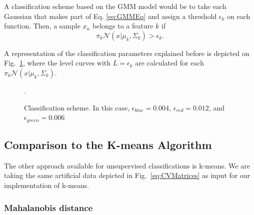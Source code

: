 \documentclass[letterpaper, 10 pt, conference]{ieeeconf}  %
\begin{document}
A classification scheme based on the GMM model would be to take each Gaussian that makes part of Eq. \ref{eq:GMMEq} and assign a threshold $\epsilon_{k}$ on each function.  Then, a sample $x_{n}$ belongs to a feature $k$ if  
\begin{equation*}
    \pi_{k} \mathcal{N}(x | \mu_{k},\Sigma_{k}) > \epsilon_{k}.
\end{equation*}

A representation of the classification parameters explained before is depicted on Fig.~\ref{fig:LevelsClassificationInsight}, where the level curves with $L = \epsilon_{k}$ are calculated for each $\pi_{k} \mathcal{N}(x | \mu_{k},\Sigma_{k}) $.

\begin{figure}[thpb]
      \centering
      \caption{Classification scheme. In this case, $\epsilon_{blue} = 0.004$, $\epsilon_{red} = 0.012$, and $\epsilon_{green} = 0.006$}.
      \label{fig:LevelsClassificationInsight}
\end{figure}

\subsection{Comparison to the K-means Algorithm}
\label{sec:Experiment_Comparison_Kmeans_Algorithm}

The other approach available for unsupervised classifications is k-means. We are taking the same artificial data depicted in Fig.~\ref{eq:CVMatrices} as
input for our implementation of k-means.


\subsubsection{Mahalanobis distance}
\label{sec:Experiment_Mahalanobis_distance}
\end{document}
